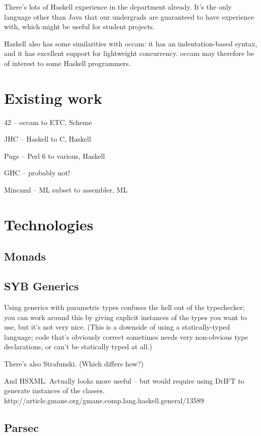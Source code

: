 \documentclass[a4paper,12pt]{article}
\def\occam{{\sffamily occam}\xspace}
\begin{document}
There's lots of Haskell experience in the department already. It's the
only language other than Java that our undergrads are guaranteed to have
experience with, which might be useful for student projects.

Haskell also has some similarities with \occam: it has an
indentation-based syntax, and it has excellent support for lightweight
concurrency. \occam may therefore be of interest to some Haskell
programmers.

\section{Existing work}

42 -- \occam to ETC, Scheme

JHC -- Haskell to C, Haskell

Pugs -- Perl 6 to various, Haskell

GHC -- probably not!

Mincaml -- ML subset to assembler, ML

\section{Technologies}

\subsection{Monads}

\subsection{SYB Generics}

\cite{syb1}

\label{gen-par-prob} Using generics with parametric types confuses the
hell out of the typechecker; you can work around this by giving explicit
instances of the types you want to use, but it's not very nice.
(This is a downside of using a statically-typed language; code that's
obviously correct sometimes needs very non-obvious type declarations, or
can't be statically typed at all.)

There's also Strafunski. (Which differs how?)

And HSXML. Actually looks more useful -- but would require using DrIFT
to generate instances of the classes.
http://article.gmane.org/gmane.comp.lang.haskell.general/13589

\subsection{Parsec}
\end{document}
